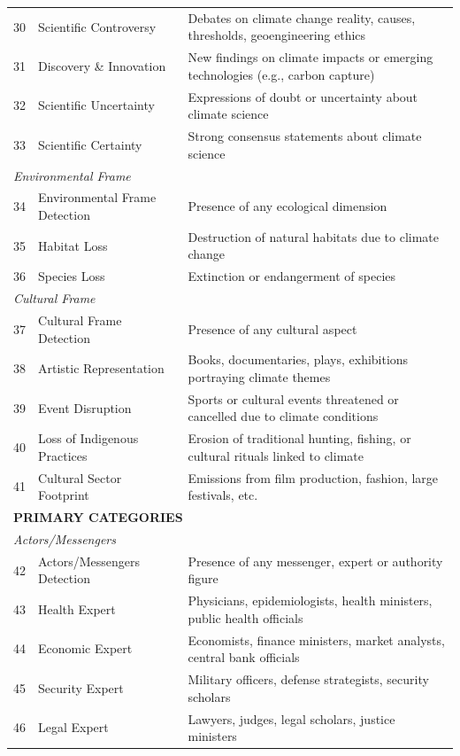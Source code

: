 {\begin{longtable}{p{0.5cm}p{5cm}p{16cm}}
30 & Scientific Controversy & Debates on climate change reality, causes, thresholds, geoengineering ethics \\
31 & Discovery \& Innovation & New findings on climate impacts or emerging technologies (e.g., carbon capture) \\
32 & Scientific Uncertainty & Expressions of doubt or uncertainty about climate science \\
33 & Scientific Certainty & Strong consensus statements about climate science \\
\midrule
\multicolumn{3}{l}{\textit{Environmental Frame}} \\
34 & Environmental Frame Detection & Presence of any ecological dimension \\
35 & Habitat Loss & Destruction of natural habitats due to climate change \\
36 & Species Loss & Extinction or endangerment of species \\
\midrule
\multicolumn{3}{l}{\textit{Cultural Frame}} \\
37 & Cultural Frame Detection & Presence of any cultural aspect \\
38 & Artistic Representation & Books, documentaries, plays, exhibitions portraying climate themes \\
39 & Event Disruption & Sports or cultural events threatened or cancelled due to climate conditions \\
40 & Loss of Indigenous Practices & Erosion of traditional hunting, fishing, or cultural rituals linked to climate \\
41 & Cultural Sector Footprint & Emissions from film production, fashion, large festivals, etc. \\
\midrule
\multicolumn{3}{l}{\cellcolor{gray!10}\textbf{PRIMARY CATEGORIES}} \\
\midrule
\multicolumn{3}{l}{\textit{Actors/Messengers}} \\
42 & Actors/Messengers Detection & Presence of any messenger, expert or authority figure \\
43 & Health Expert & Physicians, epidemiologists, health ministers, public health officials \\
44 & Economic Expert & Economists, finance ministers, market analysts, central bank officials \\
45 & Security Expert & Military officers, defense strategists, security scholars \\
46 & Legal Expert & Lawyers, judges, legal scholars, justice ministers \\

\end{longtable}}
